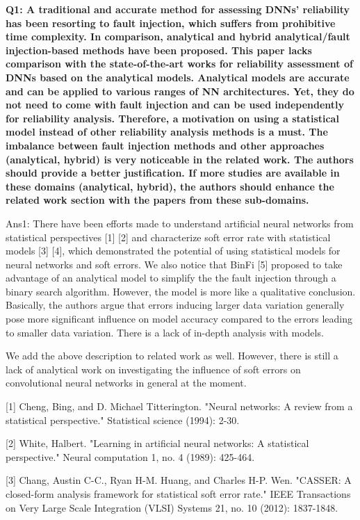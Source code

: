\textbf{Q1: A traditional and accurate method for assessing DNNs' reliability has been resorting to fault injection, which suffers from prohibitive time complexity. In comparison, analytical and hybrid analytical/fault injection-based methods have been proposed. This paper lacks comparison with the state-of-the-art works for reliability assessment of DNNs based on the analytical models. Analytical models are accurate and can be applied to various ranges of NN architectures. Yet, they do not need to come with fault injection and can be used independently for reliability analysis. Therefore, a motivation on using a statistical model instead of other reliability analysis methods is a must. The imbalance between fault injection methods and other approaches (analytical, hybrid) is very noticeable in the related work. The authors should provide a better justification. If more studies are available in these domains (analytical, hybrid), the authors should enhance the related work section with the papers from these sub-domains.}

Ans1: There have been efforts made to understand artificial neural networks from statistical perspectives [1] [2] and characterize soft error rate with statistical models [3] [4], which demonstrated the potential of using statistical models for neural networks and soft errors. We also notice that BinFi [5] proposed to take advantage of an analytical model to simplify the the fault injection through a binary search algorithm. However, the model is more like a qualitative conclusion. Basically, the authors argue that errors inducing larger data variation generally pose more significant influence on model accuracy compared to the errors leading to smaller data variation. There is a lack of in-depth analysis with models. 

We add the above description to related work as well. However, there is still a lack of analytical work on investigating the influence of soft errors on convolutional neural networks in general at the moment. 

[1] Cheng, Bing, and D. Michael Titterington. "Neural networks: A review from a statistical perspective." Statistical science (1994): 2-30.

[2] White, Halbert. "Learning in artificial neural networks: A statistical perspective." Neural computation 1, no. 4 (1989): 425-464.

[3] Chang, Austin C-C., Ryan H-M. Huang, and Charles H-P. Wen. "CASSER: A closed-form analysis framework for statistical soft error rate." IEEE Transactions on Very Large Scale Integration (VLSI) Systems 21, no. 10 (2012): 1837-1848.

